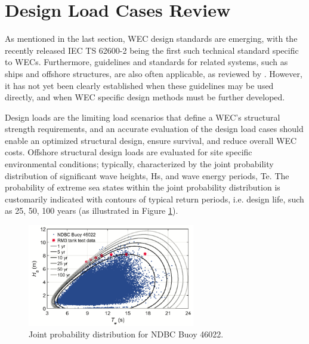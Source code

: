 \section{Design Load Cases Review}
As mentioned in the last section, WEC design standards are emerging, with the recently released IEC TS 62600-2 \cite{IECTS62600-2} being the first such technical standard specific to WECs. Furthermore, guidelines and standards for related systems, such as ships and offshore structures, are also often applicable, as reviewed by \cite{Coe2017,WaveEnergyScotland2016}. However, it has not yet been clearly established when these guidelines may be used directly, and when WEC specific design methods must be further developed.

Design loads are the limiting load scenarios that define a WEC's structural strength requirements, and an accurate evaluation of the design load cases should enable an optimized structural design, ensure survival, and reduce overall WEC costs. Offshore structural design loads are evaluated for site specific environmental conditions; typically, characterized by the joint probability distribution of significant wave heights, Hs, and wave energy periods, Te. The probability of extreme sea states within the joint probability distribution is customarily indicated with contours of typical return periods, i.e. design life, such as 25, 50, 100 years (as illustrated in Figure \ref{fig:JPD}).

\begin{figure}[!t]
\centering
\includegraphics[width=0.65\textwidth]{./Figures/JPD.png}
\caption{Joint probability distribution for NDBC Buoy 46022.}
\label{fig:JPD}
\end{figure}

